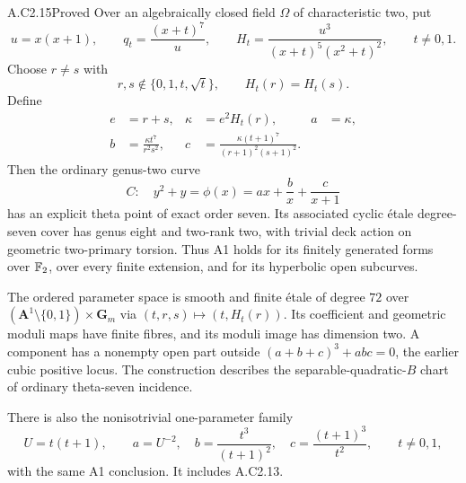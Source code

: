 \begin{claim}{A.C2.15}{Proved}
Over an algebraically closed field $\Omega$ of characteristic two, put
\[
 u=x(x+1),\qquad q_t=\frac{(x+t)^7}{u},\qquad
 H_t=\frac{u^3}{(x+t)^5(x^2+t)^2},\qquad t\ne0,1.
\]
Choose $r\ne s$ with
\[
 r,s\notin\{0,1,t,\sqrt t\},\qquad H_t(r)=H_t(s).
\]
Define
\[
 \begin{aligned}
 e&=r+s,&\kappa&=e^2H_t(r),&
 a&=\kappa,\\
 b&=\frac{\kappa t^7}{r^2s^2},&
 c&=\frac{\kappa(t+1)^7}{(r+1)^2(s+1)^2}.
 \end{aligned}                                                   \tag{C2.39}
\]
Then the ordinary genus-two curve
\[
               C:\quad y^2+y=\phi(x)
                    =ax+\frac b x+\frac c{x+1}                  \tag{C2.40}
\]
has an explicit theta point of exact order seven. Its associated
cyclic \'etale degree-seven cover has genus eight and two-rank two,
with trivial deck action on geometric two-primary torsion.
Thus A1 holds for its finitely generated forms over $\mathbb F_2$,
over every finite extension, and for its hyperbolic open subcurves.

The ordered parameter space is smooth and finite \'etale of degree
$72$ over $(\mathbf A^1\setminus\{0,1\})\times\mathbf G_m$ via
$(t,r,s)\mapsto(t,H_t(r))$. Its coefficient and geometric moduli
maps have finite fibres, and its moduli image has dimension two.
A component has a nonempty open part outside
$(a+b+c)^3+abc=0$, the earlier cubic positive locus.
The construction describes the separable-quadratic-$B$ chart
of ordinary theta-seven incidence.

There is also the nonisotrivial one-parameter family
\[
 U=t(t+1),\qquad
 a=U^{-2},\quad b=\frac{t^3}{(t+1)^2},\quad
 c=\frac{(t+1)^3}{t^2},\qquad t\ne0,1,                           \tag{C2.41}
\]
with the same A1 conclusion. It includes A.C2.13.
\end{claim}

